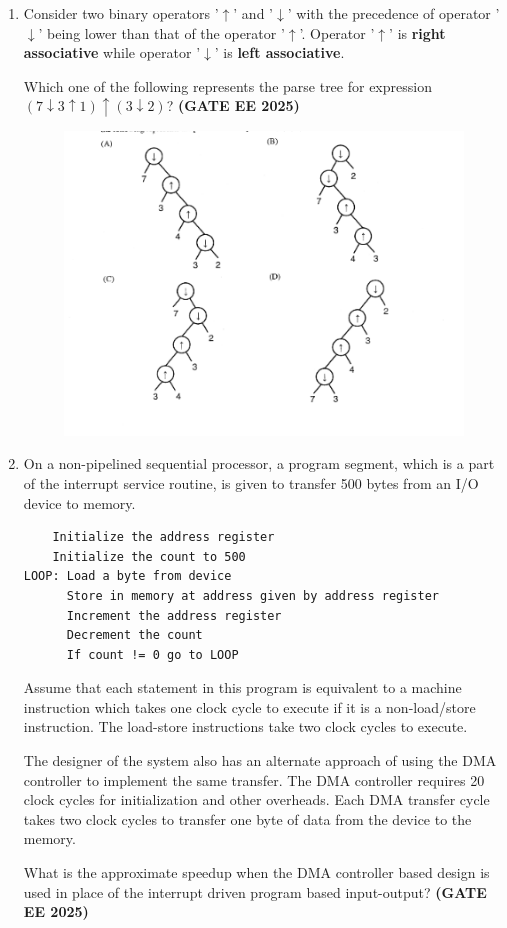 \documentclass[journal,12pt,onecolumn]{IEEEtran}
\theoremstyle{remark}
\begin{document}
\begin{enumerate}
\item Consider two binary operators '$ \uparrow $' and '$ \downarrow $' with the precedence of operator '$ \downarrow $' being lower than that of the operator '$ \uparrow $'. Operator '$ \uparrow $' is \textbf{right associative} while operator '$ \downarrow $' is \textbf{left associative}.

Which one of the following represents the parse tree for expression $ (7 \downarrow 3 \uparrow 1) \uparrow (3 \downarrow 2) $? \hfill \textbf{(GATE EE 2025)}
\begin{figure}[h]
    \centering
    \includegraphics[width=0.5\linewidth]{figs/fig4.png}
    \caption{ }
    \label{fig4}
\end{figure}

\item On a non-pipelined sequential processor, a program segment, which is a part of the interrupt service routine, is given to transfer 500 bytes from an I/O device to memory. 

\begin{verbatim}
    Initialize the address register
    Initialize the count to 500
LOOP: Load a byte from device
      Store in memory at address given by address register
      Increment the address register
      Decrement the count
      If count != 0 go to LOOP
\end{verbatim}

Assume that each statement in this program is equivalent to a machine instruction which takes one clock cycle to execute if it is a non-load/store instruction. The load-store instructions take two clock cycles to execute.  

The designer of the system also has an alternate approach of using the DMA controller to implement the same transfer. The DMA controller requires 20 clock cycles for initialization and other overheads. Each DMA transfer cycle takes two clock cycles to transfer one byte of data from the device to the memory.  

What is the approximate speedup when the DMA controller based design is used in place of the interrupt driven program based input-output?  \hfill \textbf{(GATE EE 2025)}


\end{enumerate}
\end{document}
